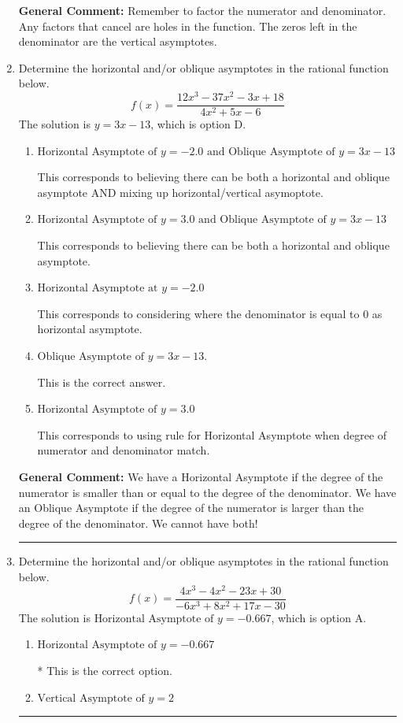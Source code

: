 \documentclass{extbook}[14pt]
\newcommand{\litem}[1]{\item #1

\rule{\textwidth}{0.4pt}}
\begin{document}
\begin{enumerate}
{\textbf{General Comment:} Remember to factor the numerator and denominator. Any factors that cancel are holes in the function. The zeros left in the denominator are the vertical asymptotes.
}
\litem{
Determine the horizontal and/or oblique asymptotes in the rational function below.
\[ f(x) = \frac{12x^{3} -37 x^{2} -3 x + 18}{4x^{2} +5 x -6} \]The solution is \( y = 3x -13 \), which is option D.\begin{enumerate}[label=\Alph*.]
\item \( \text{Horizontal Asymptote of } y = -2.0 \text{ and Oblique Asymptote of } y = 3x -13 \)

This corresponds to believing there can be both a horizontal and oblique asymptote AND mixing up horizontal/vertical asymoptote.
\item \( \text{Horizontal Asymptote of } y = 3.0 \text{ and Oblique Asymptote of } y = 3x -13 \)

This corresponds to believing there can be both a horizontal and oblique asymptote.
\item \( \text{Horizontal Asymptote at } y = -2.0 \)

This corresponds to considering where the denominator is equal to 0 as horizontal asymptote.
\item \( \text{Oblique Asymptote of } y = 3x -13. \)

This is the correct answer.
\item \( \text{Horizontal Asymptote of } y = 3.0  \)

This corresponds to using rule for Horizontal Asymptote when degree of numerator and denominator match.
\end{enumerate}

\textbf{General Comment:} We have a Horizontal Asymptote if the degree of the numerator is smaller than or equal to the degree of the denominator. We have an Oblique Asymptote if the degree of the numerator is larger than the degree of the denominator. We cannot have both!
}
\litem{
Determine the horizontal and/or oblique asymptotes in the rational function below.
\[ f(x) = \frac{4x^{3} -4 x^{2} -23 x + 30}{-6x^{3} +8 x^{2} +17 x -30} \]The solution is \( \text{Horizontal Asymptote of } y = -0.667  \), which is option A.\begin{enumerate}[label=\Alph*.]
\item \( \text{Horizontal Asymptote of } y = -0.667  \)

* This is the correct option.
\item \( \text{Vertical Asymptote of } y = 2  \)


\end{enumerate}}
\end{enumerate}
\end{document}
